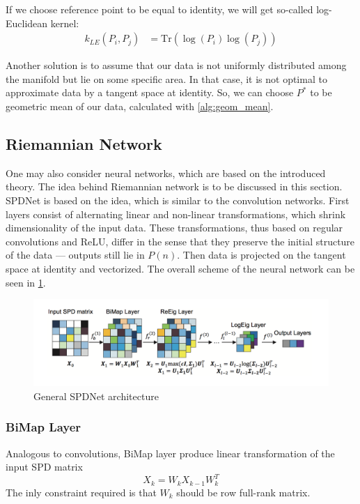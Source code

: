 \documentclass[12pt]{extarticle}
\theoremstyle{definition}
\theoremstyle{remark}
\begin{document}
	If we choose reference point to be equal to identity, we will get so-called log-Euclidean kernel:
	\begin{align*}
	k_{LE}(P_i,P_j) &=  \text{Tr}(\log(P_i)\log(P_j))
	\end{align*}
	
	Another solution is to assume that our data is not uniformly distributed among the manifold but lie on some specific area. In that case, it is not optimal to approximate data by a tangent space at identity. So, we can choose $P^*$ to be geometric mean of our data, calculated with \cref{alg:geom_mean}.
	
	\subsection{Riemannian Network}
	One may also consider neural networks, which are based on the introduced theory. The idea behind Riemannian network \cite{Huang2016} is to be discussed in this section.\\
	
	SPDNet is based on the idea, which is similar to the convolution networks. First layers consist of alternating linear and non-linear transformations, which shrink dimensionality of the input data. These transformations, thus based on regular convolutions and ReLU, differ in the sense that they preserve the initial structure of the data --- outputs still lie in $P(n)$. Then data is projected on the tangent space at identity and vectorized. The overall scheme of the neural network can be seen in \cref{fig:spd}.  
	\begin{figure}[H] 
		\includegraphics[scale=0.7]{pic/SPD_arch.png}
		\caption{General SPDNet architecture  \cite{Huang2016}}
		\label{fig:spd}
	\end{figure}
	
	\subsubsection*{BiMap Layer}
	
	Analogous to convolutions, BiMap layer produce linear transformation of the input SPD matrix
	\begin{equation*}
	X_k = W_k X_{k-1}W_k^T
	\end{equation*}
	The inly constraint required is that $W_k$ should be row full-rank matrix.
	
\end{document}
